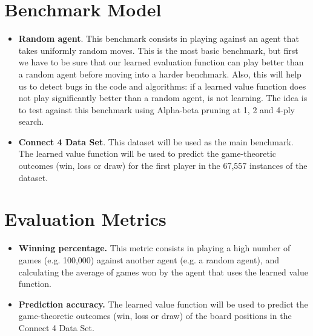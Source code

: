 \documentclass{article}
\begin{document}
\section{Benchmark Model}
\label{sec:benchmark}

\begin{itemize}

    \item \textbf{Random agent}. This benchmark consists in playing against an agent that takes
        uniformly random moves. This is the most basic benchmark, but first we have to be sure that
        our learned evaluation function can play better than a random agent before moving into a
        harder benchmark. Also, this will help us to detect bugs in the code and algorithms: if a
        learned value function does not play significantly better than a random agent, is not
        learning. The idea is to test against this benchmark using Alpha-beta pruning at 1, 2 and
        4-ply search.

    \item \textbf{Connect 4 Data Set}. This dataset will be used as the main benchmark. The learned
        value function will be used to predict the game-theoretic outcomes (win, loss or draw) for
        the first player in the 67,557 instances of the dataset.

\end{itemize}

\section{Evaluation Metrics}

\begin{itemize}

    \item \textbf{Winning percentage.} This metric consists in playing a high number of games (e.g.
        100,000) against another agent (e.g. a random agent), and calculating the average of games
        won by the agent that uses the learned value function.
        
    \item \textbf{Prediction accuracy.} The learned value function will be used to predict the
        game-theoretic outcomes (win, loss or draw) of the board positions in the Connect 4 Data
        Set.

\end{itemize}
\end{document}
